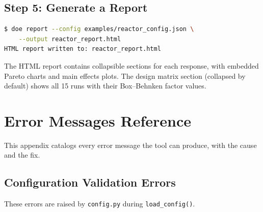 \documentclass[11pt]{book}
\begin{document}
\section{Step 5: Generate a Report}

\begin{lstlisting}[language=bash]
$ doe report --config examples/reactor_config.json \
    --output reactor_report.html
HTML report written to: reactor_report.html
\end{lstlisting}

The HTML report contains collapsible sections for each response, with embedded Pareto charts and main effects plots. The design matrix section (collapsed by default) shows all 15 runs with their Box--Behnken factor values.


\appendix

\chapter{Error Messages Reference}
\label{app:errors}

This appendix catalogs every error message the tool can produce, with the cause and the fix.

\section{Configuration Validation Errors}

These errors are raised by \texttt{config.py} during \texttt{load\_config()}.
\end{document}
